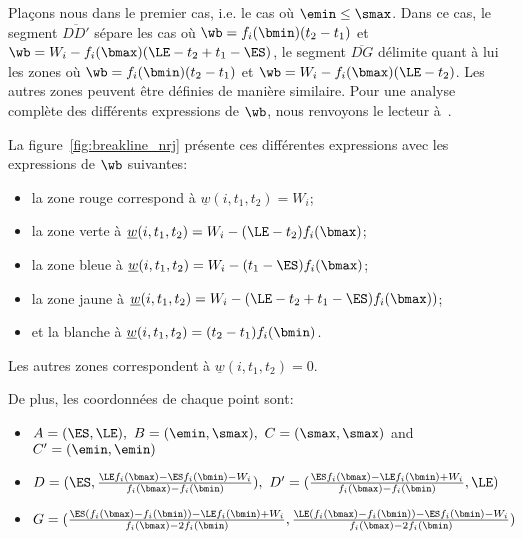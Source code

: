 Plaçons nous dans le premier cas, i.e. le cas où $\emin \le
\smax$. Dans ce cas, le segment $\overline{DD'}$ sépare les cas où
$\wb= f_i(\bmin)(t_2-t_1)$ et $\wb= W_i -
f_i(\bmax)(\LE-t_2+t_1-\ES)$, le segment $\overline{DG}$ délimite
quant à lui les zones où $\wb=f_i(\bmin)(t_2-t_1)$ et $\wb= W_i -
f_i(\bmax)(\LE-t_2)$. Les autres zones peuvent être définies de
manière similaire. Pour une analyse complète des différents
expressions de $\wb$, nous renvoyons le lecteur
à~\cite{ArtiguesLopez}. 

La figure~\ref{fig:breakline_nrj} présente ces différentes expressions
avec les expressions de $\wb$ suivantes: 
\begin{itemize}
\item la zone rouge correspond à $\underline{w}(i,t_1,t_2)=W_i$;
\item la zone verte à $\underline{w}(i,t_1,t_2)=W_i-(\LE-t_2)f_i(\bmax)$;
\item la zone bleue à $\underline{w}(i,t_1,t_2)=W_i-(t_1-\ES)f_i(\bmax)$;
\item la zone jaune à
  $\underline{w}(i,t_1,t_2)=W_i-(\LE-t_2+t_1-\ES)f_i(\bmax))$;
\item et la blanche à $\underline{w}(i,t_1,t_2)=(t_2-t_1)f_i(\bmin)$.
\end{itemize}
Les autres zones correspondent à $\underline{w}(i,t_1,t_2)=0$.

De plus, les coordonnées de chaque point sont:
\begin{itemize}
\item $A=(\ES,\LE),\ B=(\emin,\smax),\
  C=(\smax,\smax)$ and $C'=(\emin,\emin)$
\item
  $D=(\ES,\frac{\LE f_i(\bmax)-\ES f_i(\bmin)-W_i}{f_i(\bmax)-f_i(\bmin)}),\
  D'=(\frac{\ES f_i(\bmax)-\LE f_i(\bmin)+W_i}{f_i(\bmax)-f_i(\bmin)},\LE)$
\item
  $G=(\frac{\ES(f_i(\bmax)-f_i(\bmin))-\LE f_i(\bmin)+W_i}{f_i(\bmax)-2f_i(\bmin)},
  \frac{\LE(f_i(\bmax)-f_i(\bmin))-\ES f_i(\bmin)-W_i}{f_i(\bmax)-2f_i(\bmin)})$
\end{itemize}



